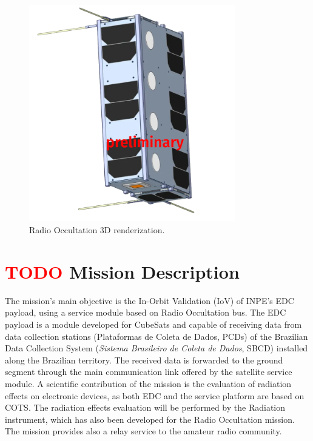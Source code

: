 \begin{figure}[!ht]
    \begin{center}
        \includegraphics[width=0.8\textwidth]{figures/rocus-sat.png}
        \caption{Radio Occultation 3D renderization.}
        \label{fig:Radio Occultation-render}
    \end{center}
\end{figure}

\section{ \textcolor{red}{TODO} Mission Description}
The mission's main objective is the In-Orbit Validation (IoV) of INPE's EDC payload, using a service module based on Radio Occultation bus. The EDC payload is a module developed for CubeSats and capable of receiving data from data collection stations (Plataformas de Coleta de Dados, PCDs) of the Brazilian Data Collection System (\textit{Sistema Brasileiro de Coleta de Dados}, SBCD) installed along the Brazilian territory. The received data is forwarded to the ground segment through the main communication link offered by the satellite service module. A scientific contribution of the mission is the evaluation of radiation effects on electronic devices, as both EDC and the service platform are based on COTS. The radiation effects evaluation will be performed by the Radiation instrument, which has also been developed for the Radio Occultation mission. The mission provides also a relay service to the amateur radio community.

